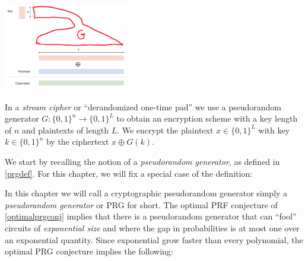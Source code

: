 \begin{marginfigure}
\centering
\includegraphics[width=\linewidth, height=1.5in, keepaspectratio]{../figure/derandonetimepad.png}
\caption{In a \emph{stream cipher} or ``derandomized one-time pad'' we
use a pseudorandom generator \(G:\{0,1\}^n \rightarrow \{0,1\}^L\) to
obtain an encryption scheme with a key length of \(n\) and plaintexts of
length \(L\). We encrypt the plaintext \(x\in \{0,1\}^L\) with key
\(k\in \{0,1\}^n\) by the ciphertext \(x \oplus G(k)\).}
\label{derandonetimepadfig}
\end{marginfigure}

We start by recalling the notion of a \emph{pseudorandom generator}, as
defined in \cref{prgdef}. For this chapter, we will fix a special case
of the definition:

\hypertarget{cryptoprg}{}

In this chapter we will call a cryptographic pseudorandom generator
simply a \emph{pseudorandom generator} or PRG for short. The optimal PRF
conjecture of \cref{optimalprgconj} implies that there is a pseudorandom
generator that can ``fool'' circuits of \emph{exponential size} and
where the gap in probabilities is at most one over an exponential
quantity. Since exponential grow faster than every polynomial, the
optimal PRG conjecture implies the following:

